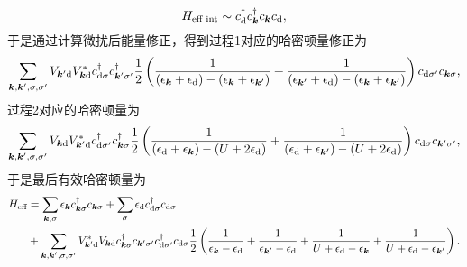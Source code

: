 \[
    {H}_\text{eff int} \sim {c}^\dagger_{\text{d}} {c}^\dagger_{\vb*{k}} {c}_{\vb*{k}} {c}_{\text{d}},
\]
于是通过计算微扰后能量修正，得到过程1对应的哈密顿量修正为
\[
    \sum_{\vb*{k}, \vb*{k}', \sigma, \sigma'} V_{\vb*{k}' \text{d}} V^*_{\vb*{k} \text{d}} 
    {c}_{\text{d} \sigma}^\dagger {c}^\dagger_{\vb*{k}' \sigma'} 
    \frac{1}{2} \left( 
        \frac{1}{(\epsilon_{\vb*{k}} + \epsilon_\text{d}) - (\epsilon_{\vb*{k}} + \epsilon_{\vb*{k}'})} + \frac{1}{(\epsilon_{\vb*{k}'} + \epsilon_\text{d}) - (\epsilon_{\vb*{k}} + \epsilon_{\vb*{k}'})} 
    \right)
    {c}_{\text{d} \sigma'} {c}_{\vb*{k} \sigma} ,
\]
过程2对应的哈密顿量为
\[
    \sum_{\vb*{k}, \vb*{k}', \sigma, \sigma'} V_{\vb*{k} \text{d}} V_{\vb*{k}' \text{d}}^*
    {c}^\dagger_{\text{d} \sigma'} {c}^\dagger_{\vb*{k} \sigma}
    \frac{1}{2} \left(
        \frac{1}{(\epsilon_\text{d} + \epsilon_{\vb*{k}}) - (U + 2 \epsilon_{\text{d}})} + \frac{1}{(\epsilon_\text{d} + \epsilon_{\vb*{k}'}) - (U + 2 \epsilon_{\text{d}})}
    \right)
    {c}_{\text{d} \sigma} {c}_{\vb*{k}' \sigma'},
\]
于是最后有效哈密顿量为
\begin{equation}
    \begin{aligned}
        {H}_\text{eff} &= \sum_{\vb*{k}, \sigma} \epsilon_{\vb*{k}} {c}_{\vb*{k}\sigma}^\dagger {c}_{\vb*{k} \sigma} + \sum_\sigma \epsilon_\text{d} {c}_{\text{d}\sigma}^\dagger {c}_{\text{d} \sigma} \\
        & + \sum_{\vb*{k}, \vb*{k}', \sigma, \sigma'} V_{\vb*{k}' \text{d}}^* V_{\vb*{k} \text{d}} {c}^\dagger_{\vb*{k} \sigma} {c}_{\vb*{k}' \sigma'} {c}^\dagger_{\text{d} \sigma'} {c}_{\text{d} \sigma} 
        \frac{1}{2} \left( \frac{1}{\epsilon_{\vb*{k}}- \epsilon_\text{d}} + \frac{1}{\epsilon_{\vb*{k}'} - \epsilon_\text{d}} + \frac{1}{U + \epsilon_\text{d} - \epsilon_{\vb*{k}}} + \frac{1}{U + \epsilon_\text{d} - \epsilon_{\vb*{k}'}} \right).
    \end{aligned}
    \label{eq:effective-anderson}
\end{equation}


